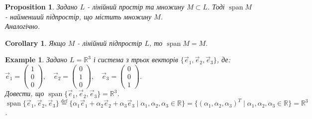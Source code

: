\documentclass[a4paper, 10pt]{article}
\theoremstyle{theoremdd}
\newtheorem{example}[theorem]{Example}
\newtheorem{proposition}[theorem]{Proposition}
\newtheorem{remark}[theorem]{Remark}
\newtheorem{corollary}[theorem]{Corollary}
\DeclareMathOperator{\linspan}{span}
\begin{document}
	\begin{proposition}
	Задано $L$ - лінійний простір та множину $M \subset L$. Тоді $\linspan M$ - найменший підпростір, що містить множину $M$.\\
	\textit{Аналогічно.}
	\end{proposition}
	
	\begin{corollary}
	Якщо $M$ - лінійний підпростір $L$, то $\linspan M = M$.
	\end{corollary}
	
	\begin{example}
	\label{find_span_of_elements}
	Задано $L = \mathbb{R}^3$ і система з трьох векторів $\{\vec{e}_1,\vec{e}_2,\vec{e}_3\}$, де:\\
	$\vec{e}_1 =\begin{pmatrix} 1\\ 0\\ 0 \end{pmatrix}, \quad \vec{e}_2 =\begin{pmatrix} 0\\ 1\\ 0 \end{pmatrix}, \quad \vec{e}_3 =\begin{pmatrix} 0\\ 0\\ 1 \end{pmatrix}$.\\
	Довести, що $\linspan\{\vec{e}_1, \vec{e}_2, \vec{e}_3\} = \mathbb{R}^3$.\\
	$\linspan\{\vec{e}_1, \vec{e}_2, \vec{e}_3\} \overset{\text{def}}{=} \{\alpha_1 \vec{e}_1 + \alpha_2 \vec{e}_2 + \alpha_3 \vec{e}_3 \mid \alpha_1, \alpha_2, \alpha_3 \in \mathbb{R}\} = \{(\alpha_1, \alpha_2, \alpha_3)^T \mid \alpha_1, \alpha_2, \alpha_3 \in \mathbb{R}\} = \mathbb{R}^3$.
	\end{example}
	
	\iffalse
	\begin{remark}
	Трошки англійського означення. Там кажуть, що system $\{ x_n,\dots,x_n \}$ \textbf{spans} vector space $L$, if $\{x_1,\dots,x_n\} = L$. Адаптивного перекладу цього поки не знаю.
	\end{remark}
	\fi
		
\end{document}
